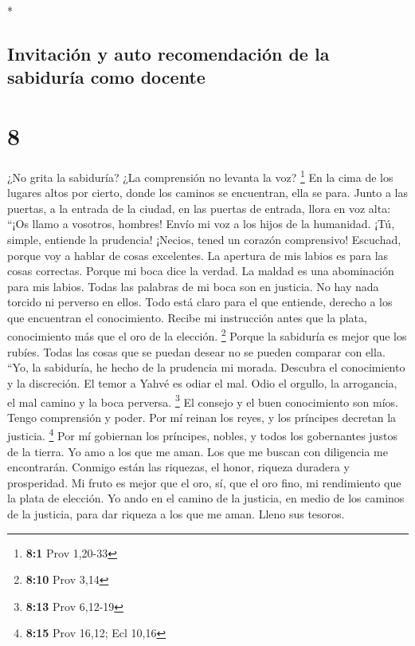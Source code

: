 \begin{paracol}{2}
\begin{otherlanguage}{english}
\end{otherlanguage}

\switchcolumn[0]*

\hypertarget{invitaciuxf3n-y-auto-recomendaciuxf3n-de-la-sabiduruxeda-como-docente}{%
\subsection{Invitación y auto recomendación de la sabiduría como
docente}\label{invitaciuxf3n-y-auto-recomendaciuxf3n-de-la-sabiduruxeda-como-docente}}

\hypertarget{section-14}{%
\section{8}\label{section-14}}

 ¿No grita la sabiduría? ¿La comprensión no levanta la
voz? \footnote{\textbf{8:1} Prov 1,20-33}  En la cima de
los lugares altos por cierto, donde los caminos se encuentran, ella se
para.  Junto a las puertas, a la entrada de la ciudad, en
las puertas de entrada, llora en voz alta:  ``¡Os llamo a
vosotros, hombres! Envío mi voz a los hijos de la humanidad.
 ¡Tú, simple, entiende la prudencia! ¡Necios, tened un
corazón comprensivo!  Escuchad, porque voy a hablar de
cosas excelentes. La apertura de mis labios es para las cosas correctas.
 Porque mi boca dice la verdad. La maldad es una
abominación para mis labios.  Todas las palabras de mi
boca son en justicia. No hay nada torcido ni perverso en ellos.
 Todo está claro para el que entiende, derecho a los que
encuentran el conocimiento.  Recibe mi instrucción antes
que la plata, conocimiento más que el oro de la elección. \footnote{\textbf{8:10}
  Prov 3,14}  Porque la sabiduría es mejor que los
rubíes. Todas las cosas que se puedan desear no se pueden comparar con
ella.  ``Yo, la sabiduría, he hecho de la prudencia mi
morada. Descubra el conocimiento y la discreción.  El
temor a Yahvé es odiar el mal. Odio el orgullo, la arrogancia, el mal
camino y la boca perversa. \footnote{\textbf{8:13} Prov 6,12-19}
 El consejo y el buen conocimiento son míos. Tengo
comprensión y poder.  Por mí reinan los reyes, y los
príncipes decretan la justicia. \footnote{\textbf{8:15} Prov 16,12; Ecl
  10,16}  Por mí gobiernan los príncipes, nobles, y todos
los gobernantes justos de la tierra.  Yo amo a los que me
aman. Los que me buscan con diligencia me encontrarán. 
Conmigo están las riquezas, el honor, riqueza duradera y prosperidad.
 Mi fruto es mejor que el oro, sí, que el oro fino, mi
rendimiento que la plata de elección.  Yo ando en el
camino de la justicia, en medio de los caminos de la justicia,
 para dar riqueza a los que me aman. Lleno sus tesoros.


\end{paracol}
